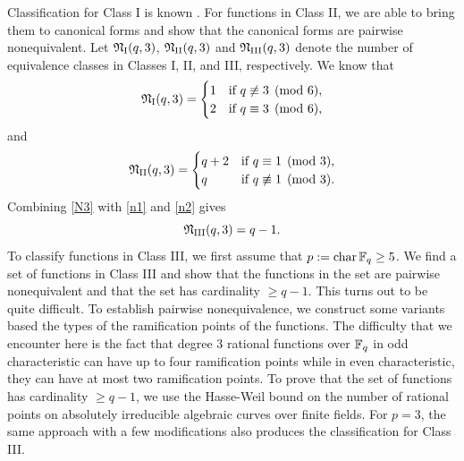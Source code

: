 \documentclass{amsart}
\numberwithin{equation}{section}
\theoremstyle{definition}
\newcommand{\f}{\Bbb F}
\newcommand{\ch}{\text{\rm char\,}}
\begin{document}
Classification for Class I is known \cite{Ferraguti-Micheli-DCC-2020}. For functions in Class II, we are able to bring them to canonical forms and show that the canonical forms are pairwise nonequivalent. Let $\frak N_{\rm I}(q,3)$, $\frak N_{\rm II}(q,3)$ and $\frak N_{\rm III}(q,3)$ denote the number of equivalence classes in Classes I, II, and III, respectively. We know that 
\begin{equation}\label{n1}
\frak N_{\rm I}(q,3)=
\begin{cases}
1&\text{if}\ q\not\equiv 3\pmod 6,\cr
2&\text{if}\ q\equiv 3\pmod 6,
\end{cases}
\end{equation}
and 
\begin{equation}\label{n2}
\frak N_{\rm II}(q,3)=
\begin{cases}
q+2&\text{if}\ q\equiv 1\pmod 3,\cr
q&\text{if}\ q\not\equiv 1\pmod 3.
\end{cases}
\end{equation}
Combining \eqref{N3} with \eqref{n1} and \eqref{n2} gives
\begin{equation}\label{n3}
\frak N_{\rm III}(q,3)=q-1.
\end{equation}
To classify functions in Class III, we first assume that $p:=\ch\f_q\ge 5$. We find a set of functions in Class III and show that the functions in the set are pairwise nonequivalent and that the set has cardinality $\ge q-1$. This turns out to be quite difficult. To establish pairwise nonequivalence, we construct some variants based the types of the ramification points of the functions. The difficulty that we encounter here is the fact that degree 3 rational functions over $\f_q$ in odd characteristic can have up to four ramification points while in even characteristic, they can have at most two ramification points. To prove that the set of functions has cardinality $\ge q-1$, we use the Hasse-Weil bound on the number of rational points on absolutely irreducible algebraic curves over finite fields. For $p=3$, the same approach with a few modifications also produces the classification for Class III.
\end{document}

